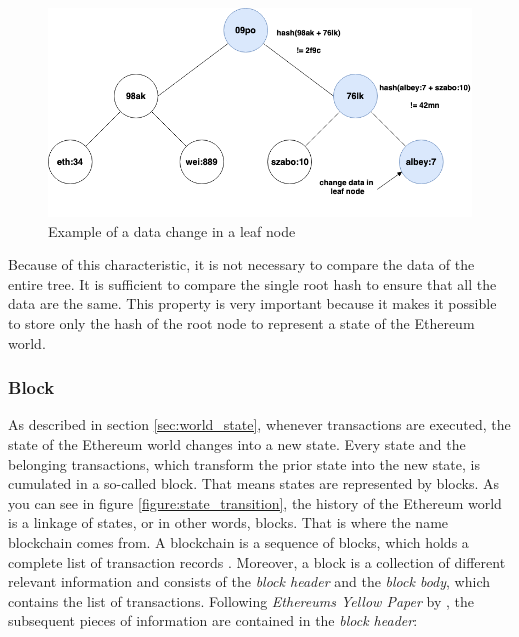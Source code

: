 \begin{figure}[htbp]
	\centering
	\includegraphics[width=.75\linewidth]{./figures/merkle_tree_change.png}
	\caption{Example of a data change in a leaf node}
	\label{figure:merkle_tree_change}
\end{figure}

Because of this characteristic, it is not necessary to compare the data of the entire tree. 
It is sufficient to compare the single root hash to ensure that all the data are the same. 
This property is very important because it makes it possible to store only the hash of 
the root node to represent a state of the Ethereum world. 

\subsubsection{Block} 
\label{sec:block}
As described in section \ref{sec:world_state}, whenever transactions are executed, 
the state of the Ethereum world changes into a new state. 
Every state and the belonging transactions, which transform the prior state into 
the new state, is cumulated in a so-called block. That means states are represented 
by blocks. As you can see in figure \ref{figure:state_transition}, the history of 
the Ethereum world is a linkage of states, or in other words, blocks. 
That is where the name blockchain comes from. A blockchain is a sequence 
of blocks, which holds a complete list of transaction records . 
Moreover, a block is a collection of different relevant information and 
consists of the \textit{block header} and the \textit{block body}, 
which contains the list of transactions. Following \textit{Ethereums Yellow Paper} 
by , the subsequent pieces of information are 
contained in the \textit{block header}:

